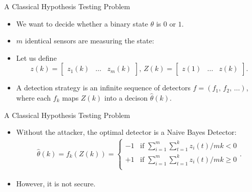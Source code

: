 \documentclass[10pt]{beamer}
\newlength\figureheight
\newlength\figurewidth
\newcommand{\tikzdir}[1]{#1.tikz}
\newcommand{\inputtikz}[1]{}}
\begin{document}
\begin{frame}{A Classical Hypothesis Testing Problem}
  \begin{itemize}
  \item We want to decide whether a binary state $\theta$ is $0$ or $1$.
  \item $m$ identical sensors are measuring the state: 
  \begin{center}
    \setlength{\figureheight}{3cm}
    \setlength{\figurewidth}{10cm}
    \inputtikz{gaussian}
  \end{center}
  \item Let us define 
    \begin{displaymath}
      z(k) = \begin{bmatrix}z_1(k)&\dots&z_m(k)\end{bmatrix},\,Z(k) = \begin{bmatrix}z(1)&\dots&z(k)\end{bmatrix}.
    \end{displaymath}
  \item A detection strategy is an infinite sequence of detectors $f = (f_1,\,f_2,\,\dots)$, where each $f_k$ maps $Z(k)$ into a decison $\hat \theta(k)$.
  \end{itemize}
\end{frame}

\begin{frame}{A Classical Hypothesis Testing Problem}
 \begin{itemize}
  \item Without the attacker, the optimal detector is a Naive Bayes Detector:
    \begin{align*}
      \hat \theta(k)=f_k(Z(k))=\begin{cases}
        -1 &\text{if }\sum_{i=1}^m\sum_{t=1}^k z_i(t)/mk < 0\\
        +1 &\text{if }\sum_{i=1}^m\sum_{t=1}^k z_i(t)/mk \geq 0\\
      \end{cases}.
    \end{align*}
  \item However, it is not secure. 
  \end{itemize}   
\end{frame}
\end{document}
